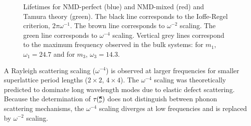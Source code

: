 \renewcommand{\textfraction}{0.0}
\begin{figure}%
\begin{center}
\renewcommand{\figure}{Fig.}
\caption{Lifetimes for NMD-perfect (blue) and NMD-mixed (red) and Tamura theory (green). The black line corresponds to the Ioffe-Regel criterion, $2\pi\omega^{-1}$. The brown line corresponds to $\omega^{-2}$ scaling. The green line corresponds to $\omega^{-4}$ scaling. Vertical grey lines correspond to the maximum frequency observed in the bulk systems: for $m_1$, $\omega_1=24.7$ and for $m_3$, $\omega_3=14.3$. } 
\label{FIG:lifetime}
\end{center}
\end{figure}

A Rayleigh scattering scaling ($\omega^{-4}$) is observed at larger frequencies for smaller superlattice period lengths ($2\times2$, $4\times4$). The $\omega^{-4}$ scaling was theoretically predicted to dominate long wavelength modes due to elastic defect scattering.\cite{PhysRev.140.A1812,klemens_scattering_1955-3, klemens_thermal_1957-2} Because the determination of $\tau\mspace{-4.0mu}\left(\mspace{-8.0mu} \begin{smallmatrix}&\pmb{\kappa} \\&\nu\end{smallmatrix} \mspace{-3.0mu}\right)$ does not distinguish between phonon scattering mechanisms, the $\omega^{-4}$ scaling diverges at low frequencies and is replaced by $\omega^{-2}$ scaling. 

